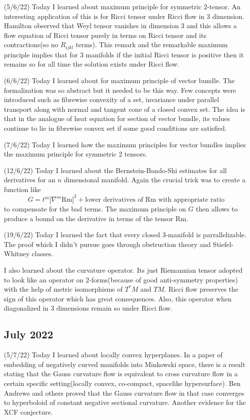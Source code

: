 \documentclass[12pt,a4paper]{article}
\begin{document}
(5/6/22) Today I learned about maximum principle for symmetric $2$-tensor. An interesting application of this is for Ricci tensor under Ricci flow in $3$ dimension. Hamilton observed that Weyl tensor vanishes in dimension $3$ and this allows a flow equation of Ricci tensor purely in terms on Ricci tensor and its contractions(so no $R_{ijkl}$ terms). This remark and the remarkable maximum principle implies that for $3$ manifolds if the initial Ricci tensor is positive then it remains so for all time the solution exists under Ricci flow.
	
(6/6/22) Today I learned about for maximum principle of vector bundle. The formalization was so abstract but it needed to be this way. Few concepts were introduced such as fibrewise convexity of a set, invariance under parallel transport along with normal and tangent cone of a closed convex set. The idea is that in the analogue of heat equation for section of vector bundle, its values continue to lie in fibrewise convex set if some good conditions are satisfied.
	
(7/6/22) Today I learned how the maximum principles for vector bundles implies the maximum principle for symmetric 2 tensors.
	
(12/6/22) Today I learned about the Bernstein-Bando-Shi estimates for all derivatives for an $n$ dimensional manifold. Again the crucial trick was to create a function like $$G = t^m| \nabla^m \text{Rm}|^2 + \text{lower derivatives of } \text{Rm} \text{ with appropriate ratio}$$ to compensate for the bad terms.
The maximum principle on $G$ then allows to produce a bound on the derivative in terms of the tensor Rm.
	
(19/6/22) Today I learned the fact that every closed $3$-manifold is parrallelizable. The proof which I didn't pursue goes through obstruction theory and Stiefel-Whitney classes.
	
I also learned about the curvature operator. Its just Riemannian tensor adopted to look like an operator on $2$-forms(because of good anti-symmetry properties) with the help of metric isomorphisms of $T^*M$ and $TM$. 
Ricci flow preserves the sign of this operator which has great consequences. Also, this operator when diagonalized in $3$ dimensions remain so under Ricci flow.
	
\subsection*{July 2022}
	
	
\quad (5/7/22) Today I learned about locally convex hyperplanes. In a paper of embedding of negatively curved manifolds into Minkowski space, there is a result stating that the Gauss curvature flow is equivalent to cross curvature flow in a certain specific setting(locally convex, co-compact, spacelike hypersurface). 
Ben Andrews and others proved that the Gauss curvature flow in that case converges to hyperboloid of constant negative sectional curvature. Another evidence for the XCF conjecture.
	
\end{document}

